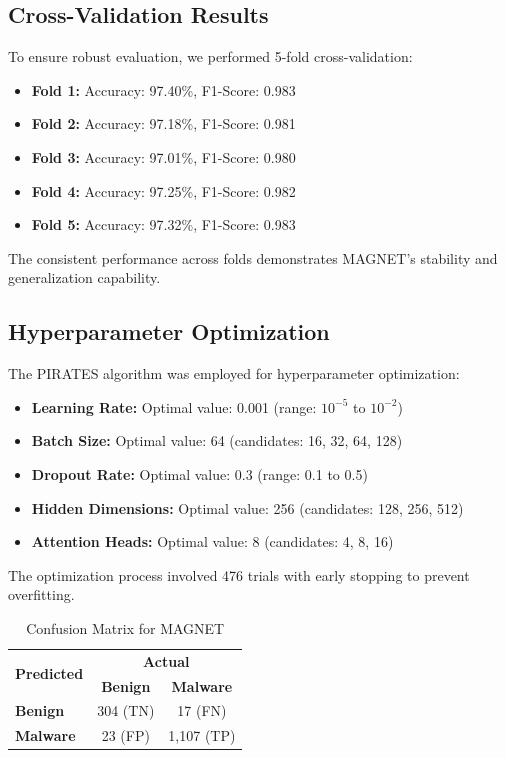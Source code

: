 \documentclass[10pt,conference]{IEEEtran}
\begin{document}
\subsection{Cross-Validation Results}
To ensure robust evaluation, we performed 5-fold cross-validation:

\begin{itemize}
    \item \textbf{Fold 1:} Accuracy: 97.40\%, F1-Score: 0.983
    \item \textbf{Fold 2:} Accuracy: 97.18\%, F1-Score: 0.981
    \item \textbf{Fold 3:} Accuracy: 97.01\%, F1-Score: 0.980
    \item \textbf{Fold 4:} Accuracy: 97.25\%, F1-Score: 0.982
    \item \textbf{Fold 5:} Accuracy: 97.32\%, F1-Score: 0.983
\end{itemize}

The consistent performance across folds demonstrates MAGNET's stability and generalization capability.

\subsection{Hyperparameter Optimization}
The PIRATES algorithm was employed for hyperparameter optimization:

\begin{itemize}
    \item \textbf{Learning Rate:} Optimal value: 0.001 (range: $10^{-5}$ to $10^{-2}$)
    \item \textbf{Batch Size:} Optimal value: 64 (candidates: 16, 32, 64, 128)
    \item \textbf{Dropout Rate:} Optimal value: 0.3 (range: 0.1 to 0.5)
    \item \textbf{Hidden Dimensions:} Optimal value: 256 (candidates: 128, 256, 512)
    \item \textbf{Attention Heads:} Optimal value: 8 (candidates: 4, 8, 16)
\end{itemize}

The optimization process involved 476 trials with early stopping to prevent overfitting.

\begin{table}[!t]
    \centering
    \caption{Confusion Matrix for MAGNET}
    \label{tab:confusion_matrix}
    \begin{tabular}{lcc}
        \toprule
        \multirow{2}{*}{\textbf{Predicted}} & \multicolumn{2}{c}{\textbf{Actual}} \\
        \cmidrule(l){2-3}
        & \textbf{Benign} & \textbf{Malware} \\
        \midrule
        \textbf{Benign} & 304 (TN) & 17 (FN) \\
        \textbf{Malware} & 23 (FP) & 1,107 (TP) \\
        \bottomrule
    \end{tabular}
\end{table}
\end{document}
